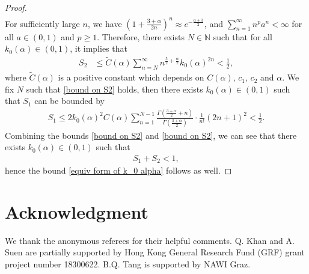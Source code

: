 \documentclass[reqno]{amsart}%
\theoremstyle{definition}
\theoremstyle{remark}
\numberwithin{equation}{section}
\newcommand{\0}{\mathbf{0}}
\newcommand{\1}{\mathbf{1}}
\numberwithin{equation}{section}
\numberwithin{theorem}{section}
\numberwithin{figure}{section}
\begin{document}
\begin{proof}
\begin{align*}
\end{align*}
For sufficiently large $n$, we have $(1+\frac{3+\alpha}{2n})^n\approx e^{-\frac{\alpha+3}{2}}$, and $\sum_{n=1}^\infty n^p a^n<\infty$ for all $a\in(0,1)$ and $p\ge1$. Therefore, there exists $N\in\mathbb{N}$ such that for all $k_0(\alpha)\in(0,1)$, it implies that
\begin{align}\label{bound on S2}
S_2&\le \tilde C(\alpha)\sum_{n=N}^\infty n^{\frac{5}{2}+\frac{\alpha}{2}}k_0(\alpha)^{2n}<\frac{1}{2},
\end{align}
where $\tilde C(\alpha)$ is a positive constant which depends on $C(\alpha)$, $c_1$, $c_2$ and $\alpha$. We fix $N$ such that \eqref{bound on S2} holds, then there exists $k_0(\alpha)\in (0,1)$ such that $S_1$ can be bounded by
\begin{align}\label{bound on S1}
S_1\le 2k_0(\alpha)^2C(\alpha)\sum_{n=1}^{N-1}  \frac{\Gamma\left(\frac{3 + \alpha}{2} + n\right)}{\Gamma\left(\frac{3 + \alpha}{2}\right)} \cdot \frac{1}{n!} (2n + 1)^{2}<\frac{1}{2}.
\end{align}
Combining the bounds \eqref{bound on S2} and \eqref{bound on S2}, we can see that there exists $k_0(\alpha)\in (0,1)$ such that
\begin{align*}
S_1+S_2<1,
\end{align*}
hence the bound \eqref{equiv form of k_0 alpha} follows as well.
\end{proof}


{\section*{Acknowledgment}
We thank the anonymous referees for their helpful comments. Q. Khan and A. Suen are partially supported by Hong Kong General Research Fund (GRF) grant project number 18300622. B.Q. Tang is supported by NAWI Graz.}





\end{document}
